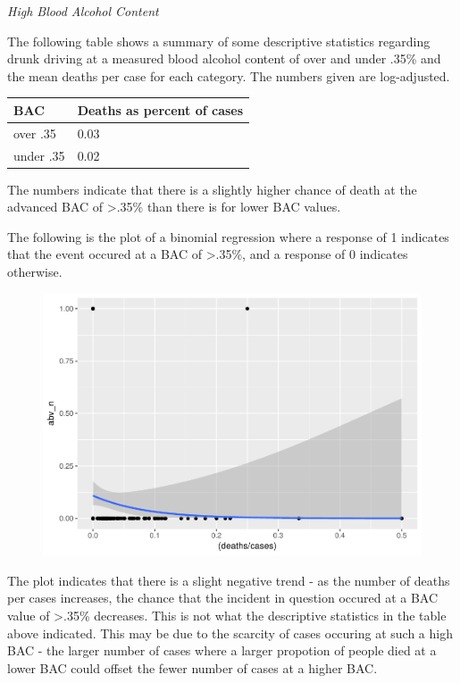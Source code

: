 \documentclass[floatsintext,man]{apa6}
\theoremstyle{definition}
\theoremstyle{definition}
\theoremstyle{definition}
\theoremstyle{remark}
\begin{document}
\emph{High Blood Alcohol Content}

The following table shows a summary of some descriptive statistics
regarding drunk driving at a measured blood alcohol content of over and
under .35\% and the mean deaths per case for each category. The numbers
given are log-adjusted.

\begin{longtable}[]{@{}ll@{}}
\toprule
BAC & Deaths as percent of cases\tabularnewline
\midrule
\endhead
over .35 & 0.03\tabularnewline
under .35 & 0.02\tabularnewline
\bottomrule
\end{longtable}

The numbers indicate that there is a slightly higher chance of death at
the advanced BAC of \textgreater{}.35\% than there is for lower BAC
values.

The following is the plot of a binomial regression where a response of 1
indicates that the event occured at a BAC of \textgreater{}.35\%, and a
response of 0 indicates otherwise.

\begin{figure}
\centering
\includegraphics{final_files/figure-latex/deathplot-1.pdf}
\caption{}
\end{figure}

The plot indicates that there is a slight negative trend - as the number
of deaths per cases increases, the chance that the incident in question
occured at a BAC value of \textgreater{}.35\% decreases. This is not
what the descriptive statistics in the table above indicated. This may
be due to the scarcity of cases occuring at such a high BAC - the larger
number of cases where a larger propotion of people died at a lower BAC
could offset the fewer number of cases at a higher BAC.
\end{document}
